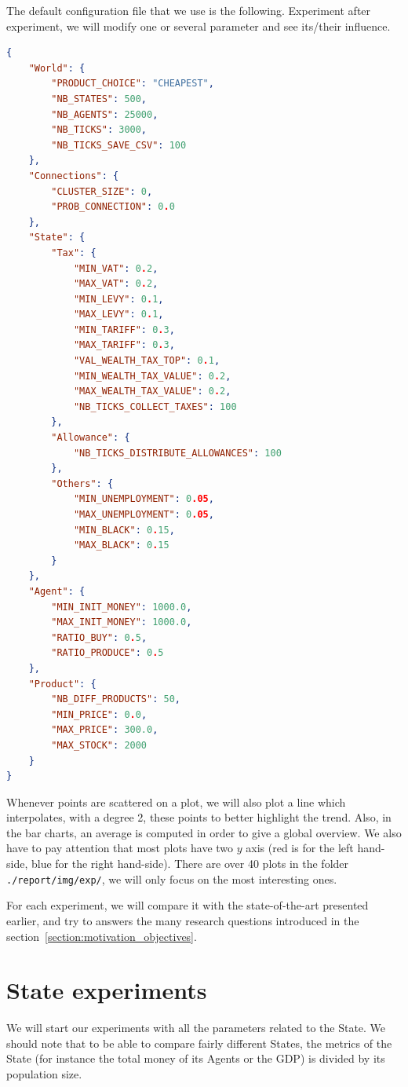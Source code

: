 The default configuration file that we use is the following. Experiment after experiment, we will modify one or several parameter and see its/their influence. 

\begin{lstlisting}[language=json,firstnumber=1]
{
    "World": {
        "PRODUCT_CHOICE": "CHEAPEST",
        "NB_STATES": 500,
        "NB_AGENTS": 25000,
        "NB_TICKS": 3000,
        "NB_TICKS_SAVE_CSV": 100
    },
    "Connections": {
        "CLUSTER_SIZE": 0,
        "PROB_CONNECTION": 0.0
    },
    "State": {
        "Tax": {
            "MIN_VAT": 0.2,
            "MAX_VAT": 0.2,
            "MIN_LEVY": 0.1,
            "MAX_LEVY": 0.1,
            "MIN_TARIFF": 0.3,
            "MAX_TARIFF": 0.3,
            "VAL_WEALTH_TAX_TOP": 0.1,
            "MIN_WEALTH_TAX_VALUE": 0.2,
            "MAX_WEALTH_TAX_VALUE": 0.2,
            "NB_TICKS_COLLECT_TAXES": 100
        },
        "Allowance": {
            "NB_TICKS_DISTRIBUTE_ALLOWANCES": 100
        },
        "Others": {
            "MIN_UNEMPLOYMENT": 0.05,
            "MAX_UNEMPLOYMENT": 0.05,
            "MIN_BLACK": 0.15,
            "MAX_BLACK": 0.15
        }
    },
    "Agent": {
        "MIN_INIT_MONEY": 1000.0,
        "MAX_INIT_MONEY": 1000.0,
        "RATIO_BUY": 0.5,
        "RATIO_PRODUCE": 0.5
    },
    "Product": {
        "NB_DIFF_PRODUCTS": 50,
        "MIN_PRICE": 0.0,
        "MAX_PRICE": 300.0,
        "MAX_STOCK": 2000
    }
}
\end{lstlisting}

Whenever points are scattered on a plot, we will also plot a line which interpolates, with a degree 2, these points to better highlight the trend. Also, in the bar charts, an average is computed in order to give a global overview. We also have to pay attention that most plots have two $y$ axis (red is for the left hand-side, blue for the right hand-side). There are over 40 plots in the folder \texttt{./report/img/exp/}, we will only focus on the most interesting ones.

For each experiment, we will compare it with the state-of-the-art presented earlier, and try to answers the many research questions introduced in the section~\ref{section:motivation_objectives}.


\section{State experiments}

We will start our experiments with all the parameters related to the State. We should note that to be able to compare fairly different States, the metrics of the State (for instance the total money of its Agents or the GDP) is divided by its population size. 

